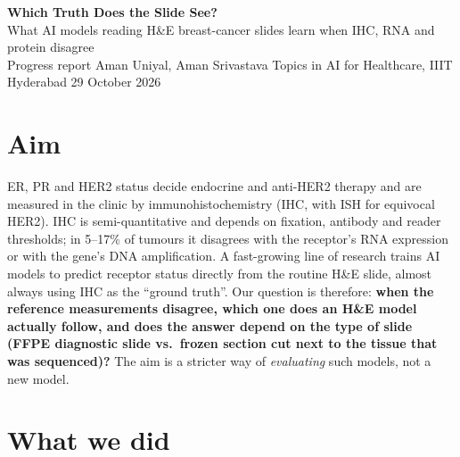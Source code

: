 \documentclass[10pt,a4paper]{article}
\begin{document}
\begin{center}
  {\large\bfseries Which Truth Does the Slide See?}\\[2pt]
  {\normalsize What AI models reading H\&E breast-cancer slides learn when IHC, RNA and protein disagree}\\[4pt]
  {\small Progress report \textbullet{} Aman Uniyal, Aman Srivastava \textbullet{} Topics in AI for Healthcare, IIIT Hyderabad \textbullet{} 29 October 2026}
\end{center}
\vspace{-4pt}

\section{Aim}

ER, PR and HER2 status decide endocrine and anti-HER2 therapy and are measured in the clinic by immunohistochemistry
(IHC, with ISH for equivocal HER2). IHC is semi-quantitative and depends on fixation, antibody and reader thresholds; in
5--17\% of tumours it disagrees with the receptor's RNA expression or with the gene's DNA amplification. A fast-growing
line of research trains AI models to predict receptor status directly from the routine H\&E slide, almost always using IHC
as the ``ground truth''. Our question is therefore: \textbf{when the reference measurements disagree, which one does an
H\&E model actually follow, and does the answer depend on the type of slide (FFPE diagnostic slide vs.\ frozen section
cut next to the tissue that was sequenced)?} The aim is a stricter way of \emph{evaluating} such models, not a new model.

\section{What we did}
\end{document}
